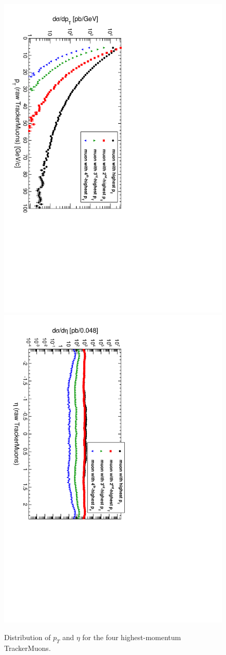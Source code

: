 \documentclass[12pt]{article}
\begin{document}
\begin{figure}
\includegraphics[height=0.5\linewidth, angle=90]{fig/backgroundsMatching_plot/ptcurves_TrackerMuons.pdf}
\includegraphics[height=0.5\linewidth, angle=90]{fig/backgroundsMatching_plot/etacurves_TrackerMuons.pdf}

\caption{Distribution of $p_T$ and $\eta$ for the four highest-momentum TrackerMuons. \label{fig:curves_TrackerMuons}}
\end{figure}
\end{document}
